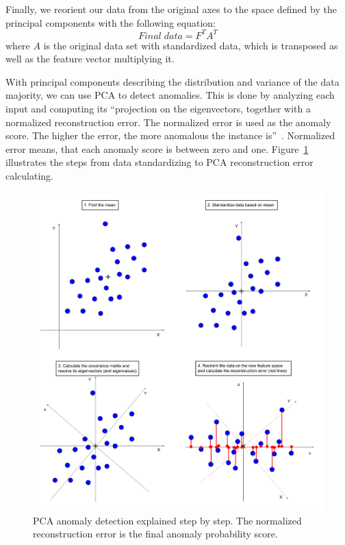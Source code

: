 Finally,
we reorient our data from the original axes
to the space defined by the principal components
with the following equation:
\begin{equation}
    Final\; data = F^{T} A^{T}
\end{equation}
where $A$ is the original data set with standardized data,
which is transposed as well as the feature vector multiplying it.\cite{jaadi2021pca,holland2008principal,smith2002tutorial}

With principal components describing the distribution and variance of the data majority,
we can use PCA to detect anomalies.
This is done by analyzing each input
and computing its
\enquote{projection on the eigenvectors,
    together with a normalized reconstruction error.
    The normalized error is used as the anomaly score.
    The higher the error, the more anomalous the instance is}~\cite{azure2022pca}.
Normalized error means,
that each anomaly score is between zero and one.
Figure~\ref{fig:pca-nutshell} illustrates the steps
from data standardizing to PCA reconstruction error calculating.

\begin{figure}[htb]
    \centering
    \includegraphics[width=\textwidth]{./appendices/pca-nutshell}
    \caption{PCA anomaly detection explained step by step.
    The normalized reconstruction error is the final anomaly probability score.
        \label{fig:pca-nutshell}}
\end{figure}


